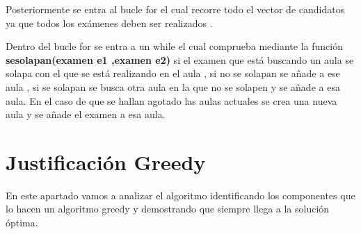 \documentclass[11pt,openany]{book}
\begin{document}
Posteriormente se entra al bucle for el cual recorre todo el vector de candidatos ya que todos los exámenes deben
ser realizados . 

Dentro del bucle for se entra a un while el cual comprueba mediante la función \textbf{sesolapan(examen e1 ,examen e2)}
si el examen que está buscando un aula se solapa con el que se está realizando en el aula , si no se solapan se añade a 
ese aula , si se solapan se busca otra aula en la que no se solapen y se añade a esa aula. En el caso de que se hallan agotado
las aulas actuales se crea una nueva aula y se añade el examen a esa aula.

\section{Justificación Greedy}

En este apartado vamos a analizar el algoritmo identificando los componentes que lo hacen un algoritmo greedy 
y demostrando que siempre llega a la solución óptima.
\end{document}
